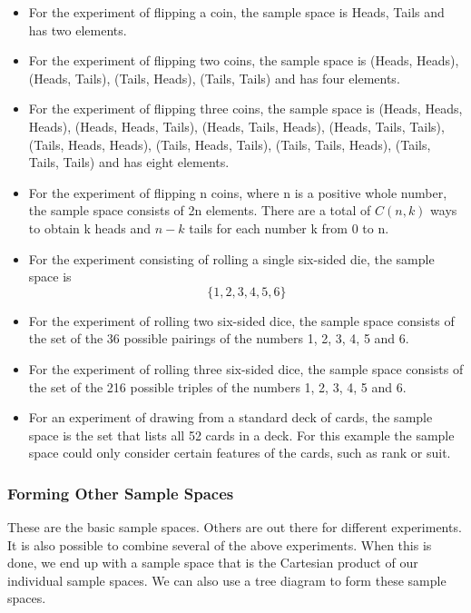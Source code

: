 \begin{itemize}
\item For the experiment of flipping a coin, the sample space is {Heads, Tails} and has two elements.

\item For the experiment of flipping two coins, the sample space is {(Heads, Heads), (Heads, Tails), (Tails, Heads), (Tails, Tails) } and has four elements.

\item For the experiment of flipping three coins, the sample space is {(Heads, Heads, Heads), (Heads, Heads, Tails), (Heads, Tails, Heads), (Heads, Tails, Tails), (Tails, Heads, Heads), (Tails, Heads, Tails), (Tails, Tails, Heads), (Tails, Tails, Tails) } and has eight elements.

\item For the experiment of flipping n coins, where n is a positive whole number, the sample space consists of 2n elements. There are a total of $C(n, k)$ ways to obtain k heads and $n - k$ tails for each number k from 0 to n.

\item For the experiment consisting of rolling a single six-sided die, the sample space is 
\[\{1, 2, 3, 4, 5, 6\} \]
\item For the experiment of rolling two six-sided dice, the sample space consists of the set of the 36 possible pairings of the numbers 1, 2, 3, 4, 5 and 6.
\item For the experiment of rolling three six-sided dice, the sample space consists of the set of the 216 possible triples of the numbers 1, 2, 3, 4, 5 and 6.
\item For an experiment of drawing from a standard deck of cards, the sample space is the set that lists all 52 cards in a deck. For this example the sample space could only consider certain features of the cards, such as rank or suit.
\end{itemize}

\subsubsection{Forming Other Sample Spaces}

These are the basic sample spaces. Others are out there for different experiments. It is also possible to combine several of the above experiments. When this is done, we end up with a sample space that is the Cartesian product of our individual sample spaces. We can also use a tree diagram to form these sample spaces.


